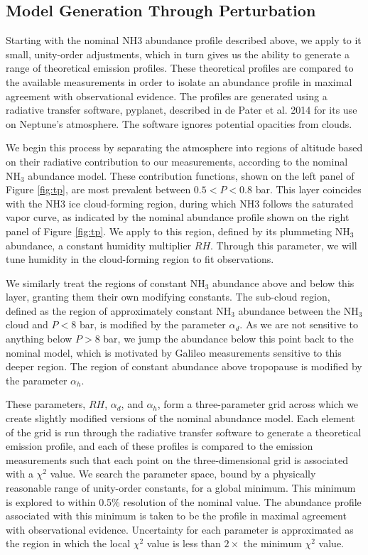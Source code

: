 \documentclass{article}
\begin{document}
\subsection{Model Generation Through Perturbation}

	Starting with the nominal NH3 abundance profile described above, we apply to it small, unity-order adjustments, which in turn gives us the ability to generate a range of theoretical emission profiles.
	These theoretical profiles are compared to the available measurements in order to isolate an abundance profile in maximal agreement with observational evidence.
	The profiles are generated using a radiative transfer software, pyplanet, described in de Pater et al. 2014 for its use on Neptune's atmosphere. The software ignores potential opacities from clouds.

	We begin this process by separating the atmosphere into regions of altitude based on their radiative contribution to our measurements, according to the nominal NH$_{3}$ abundance model.
	These contribution functions, shown on the left panel of Figure \ref{fig:tp}, are most prevalent between $0.5 < P < 0.8$ bar.
	This layer coincides with the NH3 ice cloud-forming region, during which NH3 follows the saturated vapor curve, as indicated by the nominal abundance profile shown on the right panel of Figure \ref{fig:tp}.
	We apply to this region, defined by its plummeting NH$_{3}$ abundance, a constant humidity multiplier $RH$.
	Through this parameter, we will tune humidity in the cloud-forming region to fit observations.

	We similarly treat the regions of constant NH$_{3}$ abundance above and below this layer, granting them their own modifying constants.
	The sub-cloud region, defined as the region of approximately constant NH$_{3}$ abundance between the NH$_{3}$ cloud and $P < 8$ bar, is modified by the parameter $\alpha_{d}$.
	As we are not sensitive to anything below $P > 8$ bar, we jump the abundance below this point back to the nominal model, which is motivated by Galileo measurements sensitive to this deeper region.
	The region of constant abundance above tropopause is modified by the parameter $\alpha_{h}$.

	These parameters, $RH$, $\alpha_{d}$, and $\alpha_{h}$, form a three-parameter grid across which we create slightly modified versions of the nominal abundance model.
	Each element of the grid is run through the radiative transfer software to generate a theoretical emission profile, and each of these profiles is compared to the emission measurements such that each point on the three-dimensional grid is associated with a $\chi^{2}$ value.
	We search the parameter space, bound by a physically reasonable range of unity-order constants, for a global minimum. This minimum is explored to within 0.5\% resolution of the nominal value.
	The abundance profile associated with this minimum is taken to be the profile in maximal agreement with observational evidence. Uncertainty for each parameter is approximated as the region in which the local $\chi^{2}$ value is less than $2\times$ the minimum $\chi^{2}$ value.
\end{document}
